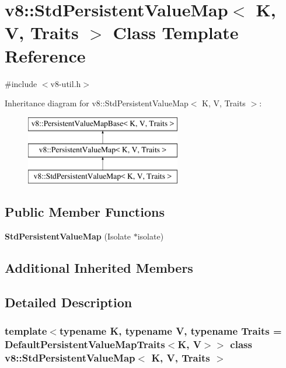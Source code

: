 \hypertarget{classv8_1_1StdPersistentValueMap}{}\section{v8\+:\+:Std\+Persistent\+Value\+Map$<$ K, V, Traits $>$ Class Template Reference}
\label{classv8_1_1StdPersistentValueMap}


{\ttfamily \#include $<$v8-\/util.\+h$>$}

Inheritance diagram for v8\+:\+:Std\+Persistent\+Value\+Map$<$ K, V, Traits $>$\+:\begin{figure}[H]
\begin{center}
\leavevmode
\includegraphics[height=3.000000cm]{classv8_1_1StdPersistentValueMap}
\end{center}
\end{figure}
\subsection*{Public Member Functions}
\begin{DoxyCompactItemize}
\item 
\mbox{\label{classv8_1_1StdPersistentValueMap_a44d7222a863267780db07c882056f73b}} 
{\bfseries Std\+Persistent\+Value\+Map} (Isolate $\ast$isolate)
\end{DoxyCompactItemize}
\subsection*{Additional Inherited Members}


\subsection{Detailed Description}
\subsubsection*{template$<$typename K, typename V, typename Traits = Default\+Persistent\+Value\+Map\+Traits$<$\+K, V$>$$>$\newline
class v8\+::\+Std\+Persistent\+Value\+Map$<$ K, V, Traits $>$}

